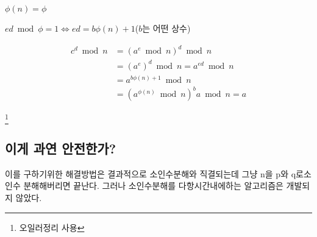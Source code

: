 $ \phi(n) = \phi$

$ ed\bmod \phi =1 \Longleftrightarrow ed = b\phi(n)+1$($b$는 어떤 상수)

\begin{align*}
  c^d \bmod n &=(a^e \bmod n)^d \bmod n \\ 
  &=(a^e)^d \bmod n = a^{ed} \bmod n \\
  &=  a^{b\phi(n)+1}\bmod n  \\
  &= (a^{\phi(n)} \bmod n)^{b} a \bmod n =a  
\end{align*}

\footnote{오일러정리 사용}

\subsection{이게 과연 안전한가?}


이를 구하기위한 해결방법은 결과적으로 소인수분해와 직결되는데 그냥 n을 p와 q로소인수 분해해버리면 끝난다. 그러나 소인수분해를 다항시간내에하는 알고리즘은 개발되지 않았다.
